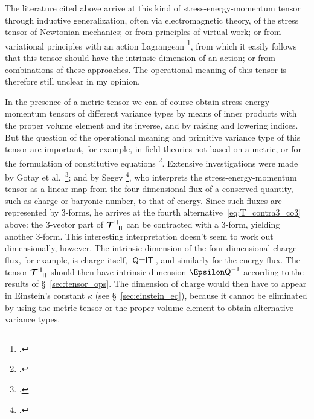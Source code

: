 \documentclass[\ifafour a4paper,12pt,\else a5paper,10pt,\fi%
onecolumn,oneside,article,%
british%
]{memoir}
\makeatletter
\theoremstyle{remark}
\theoremstyle{innote}
\newcommand*{\citep}{\footcites}
\renewcommand*{\|}[1][]{\nonscript\,#1\vert\nonscript\;\mathopen{}}
\newcommand*{\sect}{\S}%
\newcommand*{\chap}{ch.}%
\newcommand*{\cf}{{cf.}}
\newcommand*{\etal}{{et al.}}
\newcommand*{\q}{}%
\DeclareRobustCommand*{\q}{%
  \mathord{\mathpalette\bigcdot@{}}%
}
\newcommand*{\bigcdot@scalefactor}{0.7}
\newcommand*{\bigcdot@widthfactor}{1.5}
\newcommand*{\bigcdot@}[2]{%
  \sbox0{$#1\vcenter{}$}%
  \sbox2{$#1\cdot\m@th$}%
  \hbox to \bigcdot@widthfactor\wd2{%
    \hfil
    \raise\ht0\hbox{%
      \scalebox{\bigcdot@scalefactor}{%
        \lower\ht0\hbox{$#1\bullet\m@th$}%
      }%
    }%
    \hfil
  }%
}
\newcommand*{\Ti}{\textsf{T}}
\newcommand*{\Cu}{\textsf{I}}
\newcommand*{\Ch}{\textsf{Q}}
\newcommand*{\En}{\Epsilon}%
\newcommand*{\yT}{\bm{\mathcal{T}}}
\renewcommand*{\i}{\indices}
\newcommand*{\yk}{\kappa}
\newcommand*{\rul}{{\mkern2mu\rule[-0.1ex]{0.75pt}{1.1ex}\mkern2mu}}
\DeclarePairedDelimiter\mul{\rul}{\rul}%
\makeatother
\begin{document}
\medskip

The literature cited above arrive at this kind of stress-energy-momentum
tensor through inductive generalization, often via electromagnetic theory,
of the stress tensor of Newtonian mechanics; or from principles of virtual
work; or from variational principles with an action Lagrangean \citep[\cf\
also][]{hilbert1915,hilbert1917}[\sect~3.3]{hawkingetal1973_r1994}, from
which it easily follows that this tensor should have the intrinsic
dimension of an action; or from combinations of these approaches. The
operational meaning of this tensor is therefore still unclear in my
opinion.

In the presence of a metric tensor we can of course obtain
stress-energy-momentum tensors of different variance types by means of
inner products with the proper volume element and its inverse, and by
raising and lowering indices. But the question of the operational meaning
and primitive variance type of this tensor are important, for example, in
field theories not based on a metric, or for the formulation of
constitutive equations
\citep[\cf][\chap~G]{truesdelletal1960}{marsdenetal1983b_r1994,gotayetal1992}.
Extensive investigations were made by Gotay \etal\
\citep{gotayetal1998,gotayetal2004,gotayetal2006}; and by Segev
\citep{segev2002}[see also][]{segev2000b}, who interprets the
stress-energy-momentum tensor as a linear map from the four-dimensional
flux of a conserved quantity, such as charge or baryonic number, to that of
energy. Since such fluxes are represented by 3-forms, he arrives at the
fourth alternative~\eqref{eq:T_contra3_co3} above: the 3-vector part of
$\yT\i{^{\mul{\q\q\q}}_{\mul{\q\q\q}}}$ can be contracted with a 3-form,
yielding another 3-form. This interesting interpretation doesn't seem to
work out dimensionally, however. The intrinsic dimension of the
four-dimensional charge flux, for example, is charge itself,
$\Ch \equiv \Cu\Ti$, and similarly for the energy flux. The tensor
$\yT\i{^{\mul{\q\q\q}}_{\mul{\q\q\q}}}$ should then have intrinsic
dimension $\En\Ch^{-1}$ according to the results of
\sect~\ref{sec:tensor_ops}. The dimension of charge would then have to
appear in Einstein's constant $\yk$ (see \sect~\ref{sec:einstein_eq}),
because it cannot be eliminated by using the metric tensor or the proper
volume element to obtain alternative variance types.


\medskip
\end{document}
